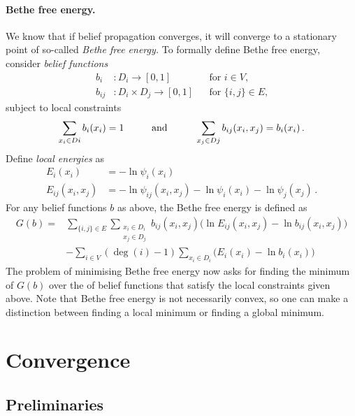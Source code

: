 \documentclass[11pt,a4paper]{article}
\theoremstyle{remark}
\newcommand{\range}{D}
\begin{document}
\paragraph{Bethe free energy.} We know that if belief propagation converges, it will converge to a stationary point of so-called \emph{Bethe free energy.} To formally define Bethe free energy, consider \emph{belief functions}
\begin{align*}
    b_{i} & \colon \range_i \to [0,1] && \text{for $i \in V$,}\\
    b_{ij} & \colon \range_i \times \range_j \to [0,1] && \text{for $\{i, j\} \in E$,}
\end{align*}
subject to local constraints
\[ \sum_{x_i \in \range{i}} b_i(x_i) = 1 \hspace{10mm}\text{and}\hspace{10mm} \sum_{x_j \in \range{j}} b_{ij}(x_i, x_j) = b_i(x_i)\,.\]
Define \emph{local energies} as
\begin{align*}
    E_{i}(x_i) &  = - \ln \psi_i(x_i) \\
    E_{ij}(x_i, x_j) & = - \ln \psi_{ij}(x_i, x_j) - \ln \psi_i(x_i)- \ln \psi_j(x_j)\,.
\end{align*}
For any belief functions $b$ as above, the Bethe free energy is defined as
\begin{align*}
   G(b) = & \sum_{\{i,j\}\in E} \sum_{\substack{ x_i \in \range_{i} \\ x_j \in \range_{j}}} b_{ij}(x_i,x_j) \bigl( \ln E_{ij}(x_i, x_j) - \ln b_{ij}(x_i,x_j)  \bigr) \\
   & - \sum_{i \in V} (\deg(i) - 1) \sum_{x_i \in \range_{i}} \bigl( E_{i}(x_i) - \ln b_i(x_i) \bigr)
\end{align*}
The problem of minimising Bethe free energy now asks for finding the minimum of $G(b)$ over the of belief functions that satisfy the local constraints given above. Note that Bethe free energy is not necessarily convex, so one can make a distinction between finding a local minimum or finding a global minimum.


\section{Convergence}

\subsection{Preliminaries}
\end{document}
